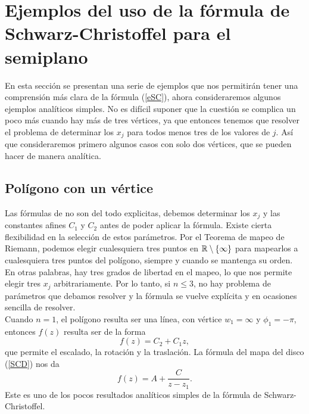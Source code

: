


\section{Ejemplos del uso de la fórmula de Schwarz-Christoffel para el semiplano}
En esta sección se presentan una serie de ejemplos que nos permitirán tener una comprensión más clara de la fórmula (\ref{eSC}), ahora consideraremos algunos ejemplos analíticos simples. No es difícil suponer que  la cuestión se complica un poco más cuando hay más de tres vértices, ya que entonces tenemos que resolver el problema de determinar los $x_j$ para todos menos tres de los valores de $j$. Así que consideraremos primero algunos casos con solo dos vértices, que se pueden hacer de manera analítica.  
\subsection{Polígono con un vértice}
Las fórmulas de \SC \; no son del todo explicitas, debemos determinar los $x_j$ y las constantes afines $C_1$ y $C_2$ antes de poder aplicar la fórmula. Existe cierta flexibilidad en la selección de estos parámetros. Por el Teorema de mapeo de Riemann, podemos elegir cualesquiera tres puntos en $\mathbb{R}\setminus\{\infty\}$ para mapearlos a cualesquiera tres puntos del polígono, siempre y cuando se mantenga su orden. En otras palabras, hay tres grados de libertad en el mapeo, lo que nos permite elegir tres  $x_j$ arbitrariamente. Por lo tanto, si $n \leq 3$, no hay problema de parámetros que debamos resolver y la fórmula \SC \; se vuelve explícita y en ocasiones sencilla de resolver.\\
Cuando $n=1$, el polígono resulta ser una línea, con vértice  $w_1=\infty$ y $\phi_1=-\pi$, entonces $f(z)$ resulta ser de la forma
$$f(z)=C_2+C_1z,$$
que permite el escalado, la rotación y la traslación. La fórmula del mapa del disco (\ref{SCD}) nos da 
$$f(z)=A+\dfrac{C}{z-z_1}.$$
Este es uno de los pocos resultados analíticos simples de la fórmula de Schwarz-Christoffel. 
